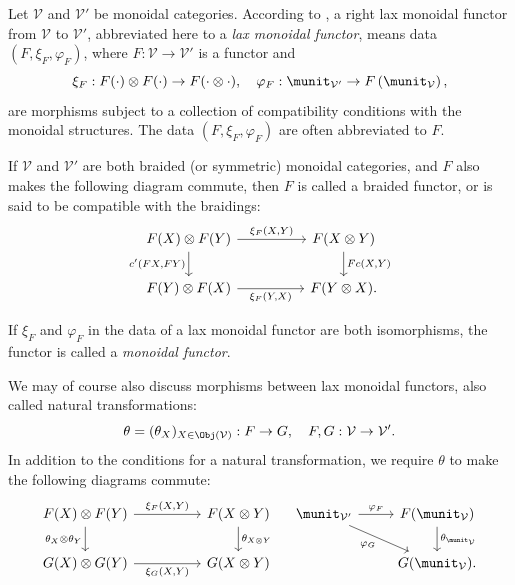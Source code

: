 \begin{definition}\label{def:lax-monoidal}
	Let $\mathcal{V}$ and $\mathcal{V}'$ be monoidal categories. According to
	\cite[Remark 3.1.8]{Li1}, a right lax monoidal functor from
	$\mathcal{V}$ to $\mathcal{V}'$, abbreviated here to a \emph{lax
	monoidal functor}, means data $(F,\xi_F,\varphi_F)$, where
	$F:\mathcal{V}\to\mathcal{V}'$ is a functor and
	\[ \xi_F: F(\cdot) \otimes F(\cdot) \to F(\cdot \otimes \cdot), \quad \varphi_F: \munit_{\mathcal{V}'} \to F\left( \munit_{\mathcal{V}} \right), \]
	are morphisms subject to a collection of compatibility conditions with
	the monoidal structures. The data $(F,\xi_F,\varphi_F)$ are often
	abbreviated to $F$.
	
	If $\mathcal{V}$ and $\mathcal{V}'$ are both braided (or symmetric)
	monoidal categories, and $F$ also makes the following diagram commute,
	then $F$ is called a braided functor, or is said to be compatible with
	the braidings:
	\[\begin{tikzcd}[column sep=huge]
		F(X) \otimes F(Y) \arrow[r, "{\xi_F(X, Y)}"] \arrow[d, "{c'(FX, FY)}"'] & F(X \otimes Y) \arrow[d, "{Fc(X, Y)}"] \\
		F(Y) \otimes F(X) \arrow[r, "{\xi_F(Y, X)}"'] & F(Y \otimes X) .
	\end{tikzcd}\]

	If $\xi_F$ and $\varphi_F$ in the data of a lax monoidal functor are both
	isomorphisms, the functor is called a \emph{monoidal functor}.
\end{definition}

We may of course also discuss morphisms between lax monoidal functors, also
called natural transformations:
\[ \theta = (\theta_X)_{X \in \Obj(\mathcal{V})}: F \to G, \quad F, G: \mathcal{V} \to \mathcal{V}' . \]
In addition to the conditions for a natural transformation, we require
$\theta$ to make the following diagrams commute:
\[\begin{tikzcd}[column sep=huge]
	F(X) \otimes F(Y) \arrow[r, "{\xi_F(X, Y)}"] \arrow[d, "{\theta_X \otimes \theta_Y}"'] & F(X \otimes Y) \arrow[d, "{\theta_{X \otimes Y}}"] \\
	G(X) \otimes G(Y) \arrow[r, "{\xi_G(X, Y)}"'] & G(X \otimes Y)
\end{tikzcd} \quad \begin{tikzcd}
	\munit_{\mathcal{V}'} \arrow[r, "{\varphi_F}"] \arrow[rd, "{\varphi_G}"'] & F(\munit_{\mathcal{V}}) \arrow[d, "{\theta_{\munit_{\mathcal{V}}}}"] \\
	& G(\munit_{\mathcal{V}}) .
\end{tikzcd}\]

